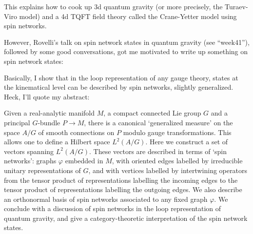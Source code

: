 \documentclass{article}
\def\tightlist{}
\renewcommand{\texttt}[1]{%
  \begingroup
  \ttfamily
  \begingroup\lccode`~=`/\lowercase{\endgroup\def~}{/\discretionary{}{}{}}%
  \begingroup\lccode`~=`[\lowercase{\endgroup\def~}{[\discretionary{}{}{}}%
  \begingroup\lccode`~=`.\lowercase{\endgroup\def~}{.\discretionary{}{}{}}%
  \catcode`/=\active\catcode`[=\active\catcode`.=\active
  \scantokens{#1\noexpand}%
  \endgroup
}
\begin{document}

This explains how to cook up 3d quantum gravity (or more precisely, the
Turaev-Viro model) and a 4d TQFT field theory called the Crane-Yetter
model using spin networks.

However, Rovelli's talk on spin network states in quantum gravity (see
``week41''), followed by some good conversations, got me motivated to
write up something on spin network states:


Basically, I show that in the loop representation of any gauge theory,
states at the kinematical level can be described by spin networks,
slightly generalized. Heck, I'll quote my abstract:

Given a real-analytic manifold \(M\), a compact connected Lie group
\(G\) and a principal \(G\)-bundle \(P \to M\), there is a canonical
`generalized measure' on the space \(A/G\) of smooth connections on
\(P\) modulo gauge transformations. This allows one to define a Hilbert
space \(L^2(A/G)\). Here we construct a set of vectors spanning
\(L^2(A/G)\). These vectors are described in terms of `spin networks':
graphs \(\varphi\) embedded in \(M\), with oriented edges labelled by
irreducible unitary representations of \(G\), and with vertices labelled
by intertwining operators from the tensor product of representations
labelling the incoming edges to the tensor product of representations
labelling the outgoing edges. We also describe an orthonormal basis of
spin networks associated to any fixed graph \(\varphi\). We conclude
with a discussion of spin networks in the loop representation of quantum
gravity, and give a category-theoretic interpretation of the spin
network states.
\end{document}
